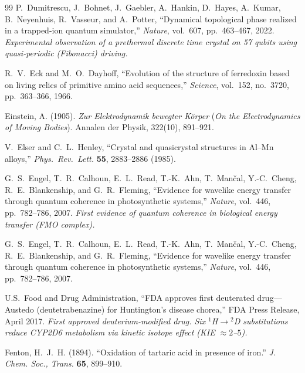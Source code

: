 \documentclass[12pt,oneside]{book}
\theoremstyle{principia}
\theoremstyle{definition}
\theoremstyle{remark}
\begin{document}
\begin{thebibliography}{99}
P.~Dumitrescu, J.~Bohnet, J.~Gaebler, A.~Hankin, D.~Hayes, A.~Kumar,
B.~Neyenhuis, R.~Vasseur, and A.~Potter,
``Dynamical topological phase realized in a trapped-ion quantum simulator,''
\emph{Nature}, vol.~607, pp.~463--467, 2022.
\textit{Experimental observation of a prethermal discrete time crystal on 57 qubits
using quasi-periodic (Fibonacci) driving.}

R.~V.~Eck and M.~O.~Dayhoff,
``Evolution of the structure of ferredoxin based on living relics of primitive amino acid sequences,''
\emph{Science}, vol.~152, no.~3720, pp.~363--366, 1966.

Einstein, A. (1905).
\textit{Zur Elektrodynamik bewegter Körper} (\textit{On the Electrodynamics of Moving Bodies}).
Annalen der Physik, 322(10), 891--921.

V.~Elser and C.~L.~Henley,
``Crystal and quasicrystal structures in Al--Mn alloys,''
\emph{Phys.~Rev.~Lett.} \textbf{55}, 2883--2886 (1985).

G.~S.~Engel, T.~R.~Calhoun, E.~L.~Read, T.-K.~Ahn, T.~Man\v{c}al, Y.-C.~Cheng,
R.~E.~Blankenship, and G.~R.~Fleming,
``Evidence for wavelike energy transfer through quantum coherence in photosynthetic systems,''
\emph{Nature}, vol.~446, pp.~782--786, 2007.
\textit{First evidence of quantum coherence in biological energy transfer (FMO complex).}

G.~S.~Engel, T.~R.~Calhoun, E.~L.~Read, T.-K.~Ahn, T.~Man\v{c}al, Y.-C.~Cheng,
R.~E.~Blankenship, and G.~R.~Fleming,
``Evidence for wavelike energy transfer through quantum coherence in photosynthetic systems,''
\emph{Nature}, vol.~446, pp.~782--786, 2007.

U.S.~Food and Drug Administration,
``FDA approves first deuterated drug---Austedo (deutetrabenazine) for Huntington's disease chorea,''
FDA Press Release, April 2017.
\textit{First approved deuterium-modified drug. Six ${}^1$H$\to$${}^2$D substitutions reduce CYP2D6 metabolism via kinetic isotope effect (KIE $\approx 2$--$5$).}


Fenton, H.~J.~H. (1894).
``Oxidation of tartaric acid in presence of iron.''
\textit{J. Chem. Soc., Trans.} \textbf{65}, 899--910.


\end{thebibliography}
\end{document}
